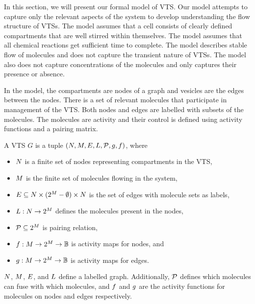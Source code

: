 In this section, we will present our formal model of VTS.
%
Our model attempts to capture only the relevant aspects of the
system to develop understanding the flow structure of VTSs.
%
The model assumes that a cell consists of clearly defined compartments
that are well stirred within themselves.
%
The model assumes that all chemical reactions get sufficient time to complete.
%
The model describes stable flow of molecules and does not
capture the transient nature of VTSs.
%
The model also does not capture concentrations of the molecules and
only captures their presence or absence.
%

In the model, the compartments are nodes of a graph
and vesicles are the edges between the nodes.
%
There is a set of relevant molecules that participate in
management of the VTS.
%
Both nodes and edges are labelled with subsets of the molecules.
%
The molecules are activity and their control is defined using
activity functions and a pairing matrix.
%

\begin{df}
  A VTS $G$ is a tuple $(N,M,E,L,\mathcal{P},g,f)$, where
  \begin{itemize}
  \item $N$ is a finite set of nodes representing compartments in the VTS,
  \item $M$ is the finite set of molecules flowing in the system, 
  \item $E \subseteq N \times (2^{M}-\emptyset) \times N$ is the
    set of edges with molecule sets as labels,
  \item $L : N \rightarrow 2^{M}$ defines the molecules present in the nodes,
  \item $\mathcal{P} \subseteq 2^{M}$ is pairing relation,
  \item $f : M \rightarrow 2^{M} \rightarrow \mathbb{B}$ is activity maps for nodes, and
  \item $g : M \rightarrow 2^{M} \rightarrow \mathbb{B} $ is activity maps for edges.
  \end{itemize}
\end{df}
$N$, $M$, $E$, and $L$ define a labelled graph.
%
Additionally, $\mathcal{P}$ defines which molecules can fuse with which molecules,
and
$f$ and $g$ are the activity functions for molecules on
nodes and edges respectively.
%

